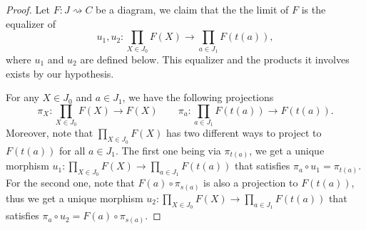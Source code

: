 \documentclass{scrartcl}
\theoremstyle{definition}
\theoremstyle{remark}
\begin{document}
\begin{proof}
    Let $F: J\rightsquigarrow C$ be a diagram, we claim that the the limit of $F$ is the equalizer of 
    \[u_1, u_2: \prod_{X \in J_0} F(X) \rightarrow \prod_{a \in J_1} F(t(a)),\]
    where $u_1$ and $u_2$ are defined below. This equalizer and the products it involves exists by our hypothesis.
    
    For any $X \in J_0$ and $a \in J_1$, we have the following projections \[\pi_X:\prod_{X \in J_0}F(X)\rightarrow F(X) \quad \quad \pi_a:\prod_{a \in J_1} F(t(a)) \rightarrow F(t(a)).\]
    Moreover, note that $\prod_{X \in J_0}F(X)$ has two different ways to project to $F(t(a))$ for all $a \in J_1$. The first one being via $\pi_{t(a)}$, we get a unique morphism $u_1:\prod_{X \in J_0} F(X) \rightarrow \prod_{a \in J_1}F(t(a))$ that satisfies $\pi_a \circ u_1 = \pi_{t(a)}$. For the second one, note that $F(a) \circ \pi_{s(a)}$ is also a projection to $F(t(a))$, thus we get a unique morphism $u_2:\prod_{X \in J_0} F(X) \rightarrow \prod_{a \in J_1}F(t(a))$ that satisfies $\pi_a \circ u_2 = F(a) \circ \pi_{s(a)}$.
    

\end{proof}
\end{document}
